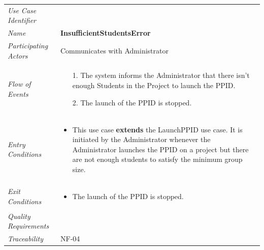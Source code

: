 \documentclass[12pt,letterpaper]{article}
\begin{document}
\begin{center}
	\begin{tabu} to 
		\toprule
		Use Case Identifier & \insufficientstudentserror{} \\
		Name & {\bf InsufficientStudentsError} \\
		Participating Actors & Communicates with Administrator \\
		Flow of Events & 
		\begin{minipage}[t]{\linewidth}
		    \begin{enumerate}
			    \item[1.] The system informs the Administrator that there isn't enough Students in the Project to launch the PPID.
			    \item[2.] The launch of the PPID is stopped.
			\end{enumerate}
	    \end{minipage} \\

		Entry Conditions &
		\begin{minipage}[t]{\linewidth}
			\begin{itemize}
			    \item This use case \textbf{extends} the LaunchPPID use case. It is initiated by the Administrator whenever the Administrator launches the PPID on a project but there are not enough students to satisfy the minimum group size.
	        \end{itemize}
	    \end{minipage} \\

		Exit Conditions &
		\begin{minipage}[t]{\linewidth}
			\begin{itemize}
			    \item The launch of the PPID is stopped.
	        \end{itemize}
	    \end{minipage} \\

		Quality Requirements & \\

		Traceability & NF-04 \\
		\toprule
	\end{tabu}
\end{center}
\end{document}
